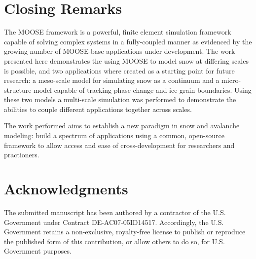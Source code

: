 \section{Closing Remarks}
The MOOSE framework is a powerful, finite element simulation framework capable of solving complex systems in a fully-coupled manner as evidenced by the growing number of MOOSE-base applications under development. The work presented here demonstrates the using MOOSE to model snow at differing scales is possible, and two applications where created as a starting point for future research: a meso-scale model for simulating snow as a continuum and a micro-structure model capable of tracking phase-change and ice grain boundaries. Using these two models a multi-scale simulation was performed to demonstrate the abilities to couple different applications together across scales.

The work performed aims to establish a new paradigm in snow and avalanche modeling: build a spectrum of applications using a common, open-source framework to allow access and ease of cross-development for researchers and practioners.



\section{Acknowledgments}
The submitted manuscript has been authored by a contractor of the
U.S. Government under Contract DE-AC07-05ID14517. Accordingly, the
U.S. Government retains a non-exclusive, royalty-free license to
publish or reproduce the published form of this contribution, or allow
others to do so, for U.S. Government purposes.
